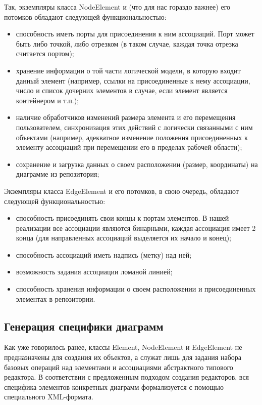 \documentclass[a5paper]{article}
\begin{document}
Так, экземпляры класса NodeElement и (что для
нас гораздо важнее) его потомков обладают следующей функциональностью:

\begin{itemize}
  \item способность иметь порты для присоединения к ним ассоциаций. Порт может
        быть либо точкой, либо отрезком (в таком случае, каждая точка отрезка
        считается портом);
  \item хранение информации о той части логической модели, в которую входит
        данный элемент (например, ссылки на присоединенные к нему ассоциации,
        число и список дочерних элементов в случае, если элемент является
        контейнером и т.п.);
  \item наличие обработчиков изменений размера элемента и его перемещения
        пользователем, синхронизация этих действий с логически связанными с ним
        объектами (например, адекватное изменение положения присоединенных к
        элементу ассоциаций при перемещении его в пределах рабочей области);
  \item сохранение и загрузка данных о своем расположении (размер, координаты)
        на диаграмме из репозитория;
\end{itemize}

Экземпляры класса EdgeElement и его потомков, в свою очередь, обладают следующей функциональностью:

\begin{itemize}
  \item способность присоединять свои концы к портам элементов. В нашей
        реализации все ассоциации являются бинарными, каждая ассоциация имеет 2
        конца (для направленных ассоциаций выделяется их начало и конец);
  \item способность ассоциаций иметь надпись (метку) над ней;
  \item возможность задания ассоциации ломаной линией;
  \item способность хранения информации о своем расположении и присоединенных
        элементах в репозитории.
\end{itemize}

\subsection{Генерация специфики диаграмм}

Как уже говорилось ранее, классы Element, NodeElement и
EdgeElement не предназначены для создания их объектов, а служат лишь для задания набора базовых операций над
элементами и ассоциациями абстрактного типового редактора. В
соответствии с предложенным подходом создания редакторов, вся специфика
элементов конкретных диаграмм формализуется с помощью специального
XML-формата.
\end{document}
